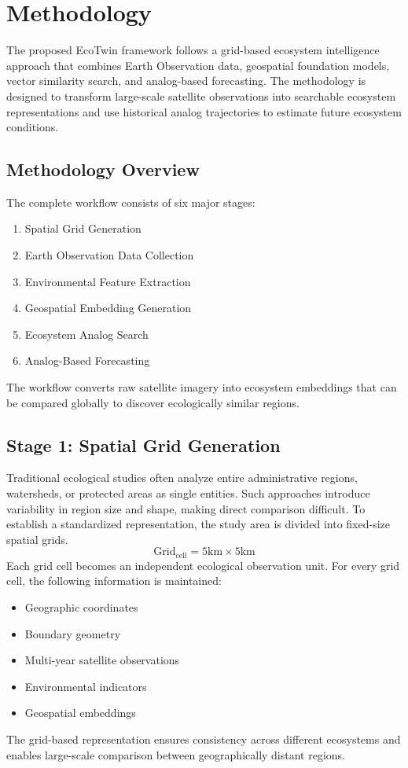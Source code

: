 \documentclass[11pt,a4paper]{article}
\begin{document}
\section{Methodology}
The proposed EcoTwin framework follows a grid-based ecosystem intelligence approach that combines Earth Observation data, geospatial foundation models, vector similarity search, and analog-based forecasting. The methodology is designed to transform large-scale satellite observations into searchable ecosystem representations and use historical analog trajectories to estimate future ecosystem conditions.

\subsection{Methodology Overview}
The complete workflow consists of six major stages:
\begin{enumerate}
\item Spatial Grid Generation
\item Earth Observation Data Collection
\item Environmental Feature Extraction
\item Geospatial Embedding Generation
\item Ecosystem Analog Search
\item Analog-Based Forecasting
\end{enumerate}
The workflow converts raw satellite imagery into ecosystem embeddings that can be compared globally to discover ecologically similar regions.

\subsection{Stage 1: Spatial Grid Generation}
Traditional ecological studies often analyze entire administrative regions, watersheds, or protected areas as single entities. Such approaches introduce variability in region size and shape, making direct comparison difficult. To establish a standardized representation, the study area is divided into fixed-size spatial grids.
\[
\text{Grid}_{\text{cell}} = 5\text{km} \times 5\text{km}
\]
Each grid cell becomes an independent ecological observation unit. For every grid cell, the following information is maintained:
\begin{itemize}
\item Geographic coordinates
\item Boundary geometry
\item Multi-year satellite observations
\item Environmental indicators
\item Geospatial embeddings
\end{itemize}
The grid-based representation ensures consistency across different ecosystems and enables large-scale comparison between geographically distant regions.
\end{document}
